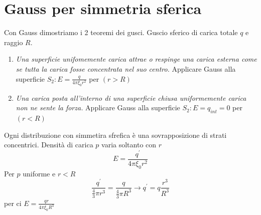 \section{Gauss per simmetria sferica}
Con Gauss dimostriamo i 2 teoremi dei gusci. Guscio sferico di carica totale $q$ e raggio $R$.
\begin{enumerate}
\item \textit{Una superficie unifomemente carica attrae o respinge una carica esterna come se tutta la carica fosse concentrata nel suo centro.} Applicare Gauss alla superficie $S_2: E=\frac{q}{4\pi \xi_0 r^2}$ per $(r>R)$
  \item \textit{Una carica posta all'interno di una superficie chiusa uniformemente carica non ne sente la forza.} Applicare Gauss alla superficie $S_2: E=q_{int}=0$ per $(r<R)$
\end{enumerate}
Ogni distribuzione con simmetira sfrefica è una sovrapposizione di strati concentrici. Densità di carica $p$ varia soltanto con $r$
\begin{equation}
  E=\frac{q^\prime}{4\pi\xi_0r^2}
\end{equation}
Per $p$ uniforme e $r<R$
\begin{equation}
  	\frac{q^\prime}{\frac{4}{3}\pi r^3}=\frac{q}{\frac{4}{3}\pi R^3}\to q^\prime=q\frac{r^3}{R^3}
\end{equation}
per ci $E=\frac{qr}{4\pi \xi_0 R^3}$
